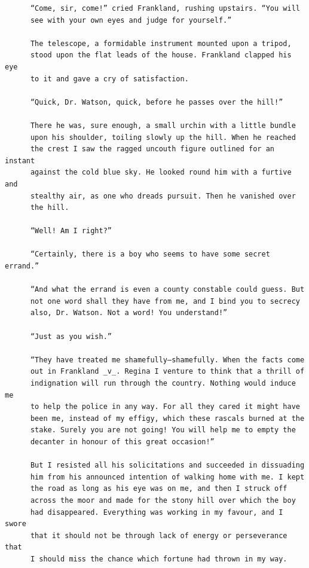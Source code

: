 \documentclass{article}
\begin{document}
\begin{verbatim}
      “Come, sir, come!” cried Frankland, rushing upstairs. “You will
      see with your own eyes and judge for yourself.”

      The telescope, a formidable instrument mounted upon a tripod,
      stood upon the flat leads of the house. Frankland clapped his eye
      to it and gave a cry of satisfaction.

      “Quick, Dr. Watson, quick, before he passes over the hill!”

      There he was, sure enough, a small urchin with a little bundle
      upon his shoulder, toiling slowly up the hill. When he reached
      the crest I saw the ragged uncouth figure outlined for an instant
      against the cold blue sky. He looked round him with a furtive and
      stealthy air, as one who dreads pursuit. Then he vanished over
      the hill.

      “Well! Am I right?”

      “Certainly, there is a boy who seems to have some secret errand.”

      “And what the errand is even a county constable could guess. But
      not one word shall they have from me, and I bind you to secrecy
      also, Dr. Watson. Not a word! You understand!”

      “Just as you wish.”

      “They have treated me shamefully—shamefully. When the facts come
      out in Frankland _v_. Regina I venture to think that a thrill of
      indignation will run through the country. Nothing would induce me
      to help the police in any way. For all they cared it might have
      been me, instead of my effigy, which these rascals burned at the
      stake. Surely you are not going! You will help me to empty the
      decanter in honour of this great occasion!”

      But I resisted all his solicitations and succeeded in dissuading
      him from his announced intention of walking home with me. I kept
      the road as long as his eye was on me, and then I struck off
      across the moor and made for the stony hill over which the boy
      had disappeared. Everything was working in my favour, and I swore
      that it should not be through lack of energy or perseverance that
      I should miss the chance which fortune had thrown in my way.


\end{verbatim}
\end{document}
